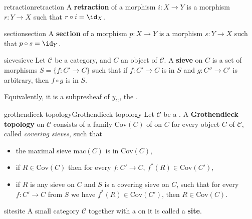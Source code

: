 \begin{topic}{retraction}{retraction}
    A \textbf{retraction} of a morphism $i : X \to Y$ is a morphism $r : Y \to X$ such that $r \circ i = \id_X$.
\end{topic}

\begin{topic}{section}{section}
    A \textbf{section} of a morphism $p : X \to Y$ is a morphism $s : Y \to X$ such that $p \circ s = \id_Y$.
\end{topic}

\begin{topic}{sieve}{sieve}
    Let $\mathcal{C}$ be a category, and $C$ an object of $\mathcal{C}$. A \textbf{sieve} on $C$ is a set of morphisms $S = \{ f : C' \to C \}$ such that if $f : C' \to C$ is in $S$ and $g : C'' \to C'$ is arbitrary, then $f \circ g$ is in $S$.
    
    Equivalently, it is a subpresheaf of $y_C$, the .
\end{topic}

\begin{topic}{grothendieck-topology}{Grothendieck topology}
    Let $\mathcal{C}$ be a . A \textbf{Grothendieck topology} on $\mathcal{C}$ consists of a family $\text{Cov}(C)$ of  on $C$ for every object $C$ of $\mathcal{C}$, called \textit{covering sieves}, such that
    \begin{itemize}
        \item the maximal sieve $\text{mac}(C)$ is in $\text{Cov}(C)$,
        \item if $R \in \text{Cov}(C)$ then for every $f : C' \to C$, $f^*(R) \in \text{Cov}(C')$,
        \item if $R$ is any sieve on $C$ and $S$ is a covering sieve on $C$, such that for every $f : C' \to C$ from $S$ we have $f^*(R) \in \text{Cov}(C')$, then $R \in \text{Cov}(C)$.
    \end{itemize}
\end{topic}

\begin{topic}{site}{site}
    A small category $\mathcal{C}$ together with a  on it is called a \textbf{site}.
\end{topic}
